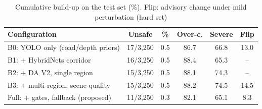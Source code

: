 \begin{table}[t]
\centering
\caption{Cumulative build-up on the test set (\%). Flip: advisory change under mild perturbation (hard set)}
\label{tab:buildup_test}
\footnotesize
\setlength{\tabcolsep}{3pt}
\begin{tabular}{lccccc}
\hline
Configuration & Unsafe & \% & Over-c. & Severe & Flip \\
\hline
B0: YOLO only (road/depth priors) & 17/3{,}250 & 0.5 & 86.7 & 66.8 & 13.0 \\
B1: + HybridNets corridor & 16/3{,}250 & 0.5 & 88.4 & 65.3 & -- \\
B2: + DA V2, single region & 15/3{,}250 & 0.5 & 88.1 & 74.3 & -- \\
B3: + multi-region, scene quality & 15/3{,}250 & 0.5 & 88.2 & 74.5 & 14.5 \\
Full: + gates, fallback (proposed) & 11/3{,}250 & 0.3 & 82.1 & 65.1 & 8.3 \\
\hline
\end{tabular}
\end{table}
